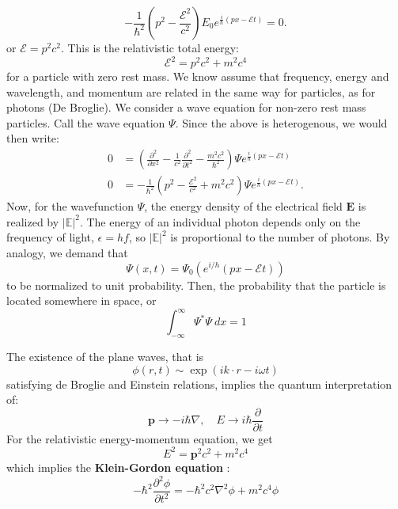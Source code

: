 \begin{equation}
    -\frac{1}{\hbar^2} \left( p^2 - \frac{\mathcal{E}^2}{c^2} \right) E_0 e^{\frac{i}{\hbar} (px - \mathcal{E} t)} = 0.
\end{equation}
or $\mathcal{E}=p^{2}c^{2}$. This is the relativistic total energy: \begin{equation}
    \mathcal{E}^{2} = p^{2}c^{2} + m^{2}c^{4}
\end{equation}
for a particle with zero rest mass. We know assume that frequency, energy and wavelength, and momentum are related in the same way for particles, as for photons (De Broglie). We consider a wave equation for non-zero rest mass particles. Call the wave equation $\Psi$. Since the above is heterogenous, we would then write: 
\begin{equation}
    \begin{split}
        0& = \left( \frac{\partial^2}{\partial x^2} - \frac{1}{c^2} \frac{\partial^2}{\partial t^2} - \frac{m^2 c^2}{\hbar^2} \right) \Psi e^{\frac{i}{\hbar} (px - \mathcal{E} t)} \\
        0 & = -\frac{1}{\hbar^2} \left( p^2 - \frac{\mathcal{E}^2}{c^2} + m^2 c^2 \right) \Psi e^{\frac{i}{\hbar} (px - \mathcal{E} t)}.
    \end{split}\label{eq:heteroeq}
\end{equation}
Now, for the wavefunction $\Psi$, the energy density of the electrical field $\mathbf{E}$ is realized by $\lvert\mathbb{E}\rvert^{2}$. The energy of an individual photon depends only on the frequency of light, $\epsilon = hf$, so $\lvert\mathbb{E}\rvert^{2}$ is proportional to the number of photons. By analogy, we demand that \begin{equation}
    \Psi(x,t) = \Psi_{0}(e^{i/h}(px-\mathcal{E}t))
\end{equation}
to be normalized to unit probability. Then, the probability that the particle is located somewhere in space, or \begin{equation}
    \int_{-\infty}^{\infty} \Psi^{*}\Psi \: dx = 1
\end{equation}


The existence of the plane waves, that is \begin{equation}
    \phi(r,t) \sim \exp{(ik\cdot r - i\omega t)}
\end{equation}
satisfying de Broglie and Einstein relations, implies the quantum interpretation of: \begin{equation}
    \bm{p} \to -i\hbar \nabla, \quad E\to i\hbar \frac{\partial }{\partial t}
\end{equation}
For the relativistic energy-momentum equation, we get \begin{equation}
    E^{2} = \bm{p}^{2}c^{2} + m^{2}c^{4}
\end{equation}
which implies the \textbf{Klein-Gordon equation} : 
\begin{equation}
    -\hbar^2 \frac{\partial^2 \phi}{\partial t^2} = -\hbar^2 c^2 \nabla^2 \phi + m^2 c^4 \phi
\end{equation}


